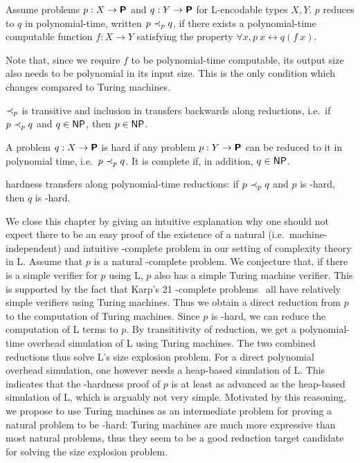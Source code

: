 \begin{definition}
  Assume problems $p : X \rightarrow \textsf{\bfseries P}$ and $q : Y \rightarrow \textsf{\bfseries P}$ for L-encodable types $X, Y$. $p$ reduces to $q$ in polynomial-time, written $p \prec_p{} q$, if there exists a polynomial-time computable function $f : X \rightarrow Y$ satisfying the property $\forall x, p~x \leftrightarrow q(f~x)$. 
\end{definition}
Note that, since we require $f$ to be polynomial-time computable, its output size also needs to be polynomial in its input size. This is the only condition which changes compared to Turing machines.

$\prec_p$ is transitive and inclusion in \NP{} transfers backwards along reductions, i.e.\ if $p \prec_p{} q$ and $q \in \textsf{NP}{}$, then $p \in \textsf{NP}{}$.

\begin{definition}
  A problem $q : X \rightarrow \textsf{\bfseries P}$ is \NP{} hard if any problem $p : Y \rightarrow \textsf{\bfseries P}$ can be reduced to it in polynomial time, i.e.\ $p \prec_p{} q$. It is \NP{} complete if, in addition, $q \in \textsf{NP}{}$.
\end{definition}

\NP{} hardness transfers along polynomial-time reductions: if $p \prec_p{} q$ and $p$ is \NP{}-hard, then $q$ is \NP{}-hard.

We close this chapter by giving an intuitive explanation why one should not expect there to be an easy proof of the existence of a natural (i.e.\ machine-independent) and intuitive \NP{}-complete problem in our setting of complexity theory in L.
Assume that $p$ is a natural \NP{}-complete problem. We conjecture that, if there is a simple verifier for $p$ using L, $p$ also has a simple Turing machine verifier. This is supported by the fact that Karp's 21 \NP{}-complete problems~\cite{Karp1972} all have relatively simple verifiers using Turing machines.
Thus we obtain a direct reduction from $p$ to the computation of Turing machines. 
Since $p$ is \NP{}-hard, we can reduce the computation of L terms to $p$. By transititivity of reduction, we get a polynomial-time overhead simulation of L using Turing machines. The two combined reductions thus solve L's size explosion problem. 
For a direct polynomial overhead simulation, one however needs a heap-based simulation of L.
This indicates that the \NP{}-hardness proof of $p$ is at least as advanced as the heap-based simulation of L, which is arguably not very simple.
Motivated by this reasoning, we propose to use Turing machines as an intermediate problem for proving a natural problem to be \NP{}-hard: Turing machines are much more expressive than most natural problems, thus they seem to be a good reduction target candidate for solving the size explosion problem.
